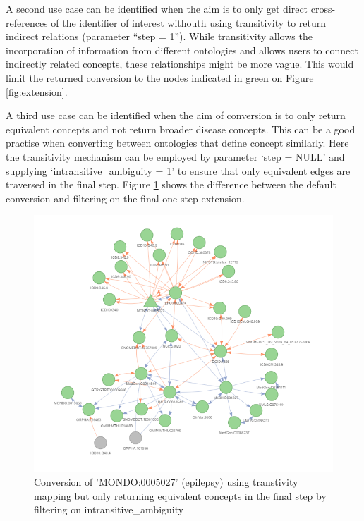 \documentclass[9pt,a4paper,]{extarticle}
\begin{document}
A second use case can be identified when the aim is to only get direct cross-references of the identifier of interest withouth using transitivity to return indirect relations (parameter ``step = 1''). While transitivity allows the incorporation of information from different ontologies and allows users to connect indirectly related concepts, these relationships might be more vague. This would limit the returned conversion to the nodes indicated in green on Figure \ref{fig:extension}.

A third use case can be identified when the aim of conversion is to only return equivalent concepts and not return broader disease concepts. This can be a good practise when converting between ontologies that define concept similarly. Here the transitivity mechanism can be employed by parameter `step = NULL' and supplying `intransitive\_ambiguity = 1' to ensure that only equivalent edges are traversed in the final step. Figure \ref{fig:equivalentConversion} shows the difference between the default conversion and filtering on the final one step extension.

\begin{figure}

{\centering \includegraphics[width=0.5\linewidth]{fig/disNet_equivalence} 

}

\caption{Conversion of 'MONDO:0005027' (epilepsy) using transtivity mapping but only returning equivalent concepts in the final step by filtering on intransitive\_ambiguity}\label{fig:equivalentConversion}
\end{figure}
\end{document}
